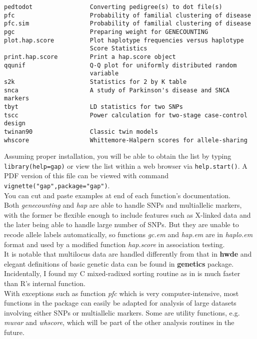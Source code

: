\documentclass[11pt,a4paper]{article}
\begin{document}
\begin{verbatim}
pedtodot                Converting pedigree(s) to dot file(s)
pfc                     Probability of familial clustering of disease
pfc.sim                 Probability of familial clustering of disease
pgc                     Preparing weight for GENECOUNTING
plot.hap.score          Plot haplotype frequencies versus haplotype
                        Score Statistics
print.hap.score         Print a hap.score object
qqunif                  Q-Q plot for uniformly distributed random
                        variable
s2k                     Statistics for 2 by K table
snca                    A study of Parkinson's disease and SNCA markers
tbyt                    LD statistics for two SNPs
tscc                    Power calculation for two-stage case-control design
twinan90                Classic twin models
whscore                 Whittemore-Halpern scores for allele-sharing
\end{verbatim}

Assuming proper installation, you will be able to obtain the list by typing
\texttt{library(help=gap)} or view the list within a web browser via 
\texttt{help.start()}. A PDF version of this file can be viewed with command
\texttt{vignette("gap",package="gap")}.\\

You can cut and paste examples at end of each function's documentation.\\

Both \textit{genecounting} and \textit{hap} are able to handle SNPs and multiallelic
markers, with the former be flexible enough to include features such as X-linked data
and the later being able to handle large number of SNPs. But they are unable to
recode allele labels automatically, so functions \textit{gc.em} and \textit{hap.em}
are in \textit{haplo.em} format and used by a modified function \textit{hap.score} in
association testing.\\

It is notable that multilocus data are handled differently from that in {\bf hwde} and
elegant definitions of basic genetic data can be found in {\bf genetics} package.\\

Incidentally, I found my C mixed-radixed sorting routine as in \cite{zhao03} is much
faster than R's internal function.\\

With exceptions such as function \textit{pfc} which is very computer-intensive, most
functions in the package can easily be adapted for analysis of large datasets involving
either SNPs or multiallelic markers. Some are utility functions, e.g. \textit{muvar}
and \textit{whscore}, which will be part of the other analysis routines in the future.\\
\end{document}
